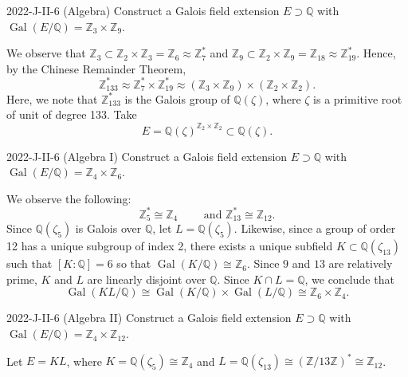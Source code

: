 \documentclass{article}
\begin{document}
\begin{prb}{2022-J-II-6 (Algebra)}
	Construct a Galois field extension $E \supset \mathbb{Q}$ with $\operatorname{Gal}(E/\mathbb{Q}) = \mathbb{Z}_{3} \times \mathbb{Z}_{9}$. 
\end{prb}
\begin{solutions}
	We observe that $\mathbb{Z}_{3} \subset \mathbb{Z}_{2}\times \mathbb{Z}_{3} = \mathbb{Z}_{6} \approx \mathbb{Z}_{7}^{\ast}$ and $\mathbb{Z}_{9} \subset \mathbb{Z}_{2} \times \mathbb{Z}_{9} = \mathbb{Z}_{18} \approx \mathbb{Z}_{19}^{\ast}$. Hence, by the Chinese Remainder Theorem, 
		\begin{equation}
			\mathbb{Z}_{133}^{\ast} \approx \mathbb{Z}_{7}^{\ast} \times \mathbb{Z}_{19}^{\ast} \approx (\mathbb{Z}_{3} \times\mathbb{Z}_{9}) \times (\mathbb{Z}_{2}\times \mathbb{Z}_{2}). 
		\end{equation}
	Here, we note that $\mathbb{Z}_{133}^{\ast}$ is the Galois group of $\mathbb{Q}(\zeta)$, where $\zeta$ is a primitive root of unit of degree 133. Take 
		\begin{equation}
			E = \mathbb{Q}(\zeta)^{\mathbb{Z}_{2} \times \mathbb{Z}_{2}} \subset \mathbb{Q}(\zeta). 
		\end{equation}
\end{solutions}
\begin{prb}{2022-J-II-6 (Algebra I)}
	Construct a Galois field extension $E \supset \mathbb{Q}$ with $\operatorname{Gal}(E/\mathbb{Q}) = \mathbb{Z}_{4} \times \mathbb{Z}_{6}$. 
\end{prb}
\begin{solutions}
	We observe the following: 
		\begin{equation}
			\mathbb{Z}_{5}^{\ast} \cong \mathbb{Z}_{4} \qquad \text{ and } \mathbb{Z}_{13}^{\ast} \cong \mathbb{Z}_{12}. 
		\end{equation}
	Since $\mathbb{Q}(\zeta_{5})$ is Galois over $\mathbb{Q}$, let $L = \mathbb{Q}(\zeta_{5})$. Likewise, since a group of order 12 has a unique subgroup of index 2, there exists a unique subfield $K \subset \mathbb{Q}(\zeta_{13})$ such that $[K:\mathbb{Q}] = 6$ so that $\operatorname{Gal}(K/\mathbb{Q}) \cong \mathbb{Z}_{6}$. Since $9$ and $13$ are relatively prime, $K$ and $L$ are linearly disjoint over $\mathbb{Q}$. Since $K \cap L = \mathbb{Q}$, we conclude that 
		\begin{equation}
			\operatorname{Gal}(KL/\mathbb{Q}) \cong \operatorname{Gal}(K/\mathbb{Q}) \times \operatorname{Gal}(L/\mathbb{Q}) \cong \mathbb{Z}_{6} \times \mathbb{Z}_{4}. 
		\end{equation}
\end{solutions}
\begin{prb}{2022-J-II-6 (Algebra II)}
		Construct a Galois field extension $E \supset \mathbb{Q}$ with $\operatorname{Gal}(E/\mathbb{Q}) = \mathbb{Z}_{4} \times \mathbb{Z}_{12}$. 
\end{prb}
\begin{solutions}
	Let $E = KL$, where $K = \mathbb{Q}(\zeta_{5}) \cong \mathbb{Z}_{4}$ and $L = \mathbb{Q}(\zeta_{13}) \cong (\mathbb{Z}/13\mathbb{Z})^{\ast} \cong \mathbb{Z}_{12}$.
\end{solutions}
\end{document}
